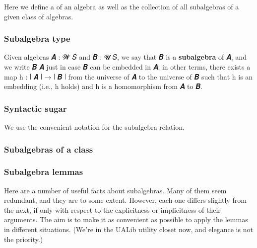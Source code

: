Here we define a  of an algebra as well as the collection of all subalgebras of a given class of algebras.
\ccpad
\begin{code}%
\end{code}


\subsubsection{Subalgebra type}\label{sssec:subalgebra-type}
Given algebras \ab 𝑨 \as :  \ab 𝓦 \ab 𝑆 and \ab 𝑩 \as :  \ab 𝓤 \ab 𝑆, we say that \ab 𝑩 is a \textbf{subalgebra} of \ab 𝑨, and we write \ab 𝑩  \ab 𝑨 just in case \ab 𝑩 can be embedded in \ab 𝑨; in other terms, there exists a map \ab h \as : \af ∣ \ab 𝑨 \af ∣ \as → \af ∣ \ab 𝑩 \af ∣ from the universe of \ab 𝑨 to the universe of \ab 𝑩 such that \ab h is an embedding (i.e.,  \ab h holds) and \ab h is a homomorphism from \ab 𝑨 to \ab 𝑩.
\ccpad
\begin{code}%
\end{code}

\subsubsection{Syntactic sugar}\label{syntactic-sugar}

We use the convenient  notation for the subalgebra relation.
\ccpad
\begin{code}%
\end{code}

\subsubsection{Subalgebras of a class}\label{sssec:subalgebras-of-a-class}

\begin{code}%
\end{code}


\subsubsection{Subalgebra lemmas}\label{sssec:subalgebra-lemmas}

Here are a number of useful facts about subalgebras. Many of them seem redundant, and they are to some extent. However, each one differs slightly from the next, if only with respect to the explicitness or implicitness of their arguments. The aim is to make it as convenient as possible to apply the lemmas in different situations. (We're in the
UALib utility closet now, and elegance is not the priority.)
\ccpad
\begin{code}%
\end{code}
